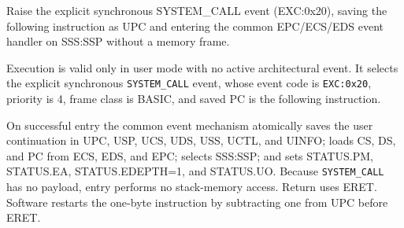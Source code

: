 Raise the explicit synchronous SYSTEM\_CALL event (EXC:0x20), saving the following instruction as UPC and entering the common EPC/ECS/EDS event handler on SSS:SSP without a memory frame.

Execution is valid only in user mode with no active architectural event. It selects the explicit synchronous \texttt{SYSTEM\_CALL} event, whose event code is \texttt{EXC:0x20}, priority is 4, frame class is BASIC, and saved PC is the following instruction.

On successful entry the common event mechanism atomically saves the user continuation in UPC, USP, UCS, UDS, USS, UCTL, and UINFO; loads CS, DS, and PC from ECS, EDS, and EPC; selects SSS:SSP; and sets STATUS.PM, STATUS.EA, STATUS.EDEPTH=1, and STATUS.UO. Because \texttt{SYSTEM\_CALL} has no payload, entry performs no stack-memory access. Return uses ERET. Software restarts the one-byte instruction by subtracting one from UPC before ERET.
